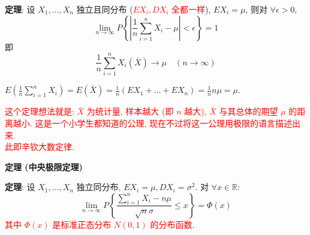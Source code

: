 \documentclass[padp]{ExBook}
\begin{document}
\textbf{定理}: 设 $X_1, \dots, X_n$ 独立且同分布 (\textcolor{red}{$EX_i, DX_i$ 全都一样}), $EX_i = \mu$, 则对 $\forall \epsilon > 0$,
$$ \lim_{n\to\infty} P\left\{\left|\frac{1}{n}\sum_{i=1}^{n}X_i - \mu\right| < \epsilon\right\} = 1 $$
即
$$ \frac{1}{n}\sum_{i=1}^{n}X_i (\bar{X}) \to \mu \quad (n \to \infty) $$

$E\left(\frac{1}{n}\sum_{i=1}^{n}X_i\right) = E(\bar{X}) = \frac{1}{n}(EX_1 + \dots + EX_n) = \frac{1}{n}n\mu = \mu$.

\textcolor{red}{这个定理想法就是: $\bar{X}$ 为统计量, 样本越大 (即 $n$ 越大), $\bar{X}$ 与其总体的期望 $\mu$ 的距离越小. 这是一个小学生都知道的公理, 现在不过将这一公理用极限的语言描述出来.} \\
\textcolor{red}{此即辛钦大数定律.}

\hrulefill
\vspace{1em}

\textbf{定理 (中央极限定理)}
\vspace{1em}

\textbf{定理}: 设 $X_1, \dots, X_n$ 独立同分布, $EX_i=\mu, DX_i=\sigma^2$.
对 $\forall x \in \mathbb{R}$:
$$ \lim_{n\to\infty} P\left\{\frac{\sum_{i=1}^{n}X_i - n\mu}{\sqrt{n}\sigma} \le x\right\} = \Phi(x) $$
\textcolor{red}{其中 $\Phi(x)$ 是标准正态分布 $N(0,1)$ 的分布函数.}
\end{document}
